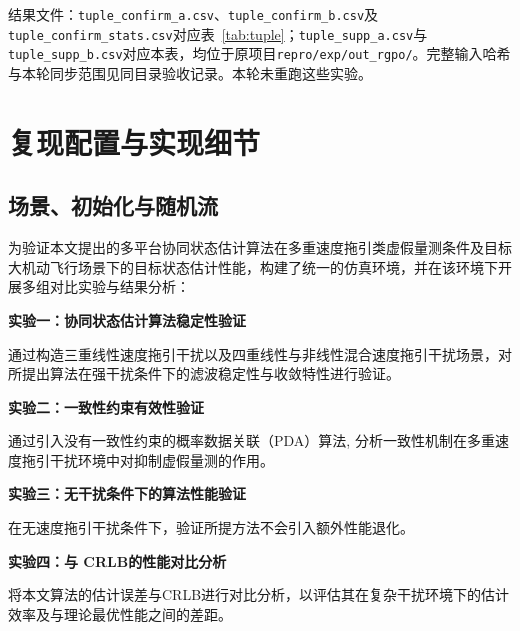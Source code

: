 \documentclass[UTF8,a4paper,zihao=-4]{ctexart}
\begin{document}
结果文件：\nolinkurl{tuple_confirm_a.csv}、\nolinkurl{tuple_confirm_b.csv}及\nolinkurl{tuple_confirm_stats.csv}对应表~\ref{tab:tuple}；\nolinkurl{tuple_supp_a.csv}与\nolinkurl{tuple_supp_b.csv}对应本表，均位于原项目\nolinkurl{repro/exp/out_rgpo/}。完整输入哈希与本轮同步范围见同目录验收记录。本轮未重跑这些实验。

\section{复现配置与实现细节}\label{sup:reproducibility}


\subsection{场景、初始化与随机流}\label{sup:setup}
为验证本文提出的多平台协同状态估计算法在多重速度拖引类虚假量测条件及目标大机动飞行场景下的目标状态估计性能，构建了统一的仿真环境，并在该环境下开展多组对比实验与结果分析：

\noindent\textbf{实验一：协同状态估计算法稳定性验证}\par

通过构造三重线性速度拖引干扰以及四重线性与非线性混合速度拖引干扰场景，对所提出算法在强干扰条件下的滤波稳定性与收敛特性进行验证。

\noindent\textbf{实验二：一致性约束有效性验证}\par

通过引入没有一致性约束的概率数据关联（PDA）算法,
分析一致性机制在多重速度拖引干扰环境中对抑制虚假量测的作用。

\noindent\textbf{实验三：无干扰条件下的算法性能验证}\par

在无速度拖引干扰条件下，验证所提方法不会引入额外性能退化。

\noindent\textbf{实验四：与 CRLB的性能对比分析}\par

将本文算法的估计误差与CRLB进行对比分析，以评估其在复杂干扰环境下的估计效率及与理论最优性能之间的差距。
\end{document}
